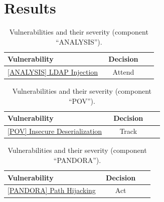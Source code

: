 \documentclass[a4paper]{article}
\begin{document}
\clearpage

\section{Results}
\label{sec:results}













        \begin{table}[h!]
        \centering
        \caption{Vulnerabilities and their severity (component ``ANALYSIS'').}
        \begin{tabular}{ p{0.65\linewidth} c d{1} }

          

          \textbf{Vulnerability} & \textbf{Decision} \\
          \hline
                      \hyperref[1:ANALYSIS:issue.md]{[ANALYSIS] LDAP Injection} & Attend \\


                  \end{tabular}
      \end{table}
          \begin{table}[h!]
        \centering
        \caption{Vulnerabilities and their severity (component ``POV'').}
        \begin{tabular}{ p{0.65\linewidth} c d{1} }

          

          \textbf{Vulnerability} & \textbf{Decision} \\
          \hline
                      \hyperref[2:POV:issue.md]{[POV] Insecure Deserialization} & Track \\


                  \end{tabular}
      \end{table}
          \begin{table}[h!]
        \centering
        \caption{Vulnerabilities and their severity (component ``PANDORA'').}
        \begin{tabular}{ p{0.65\linewidth} c d{1} }

          

          \textbf{Vulnerability} & \textbf{Decision} \\
          \hline
                      \hyperref[3:PANDORA:issue.md]{[PANDORA] Path Hijacking} & Act \\


                  \end{tabular}
      \end{table}
\end{document}
